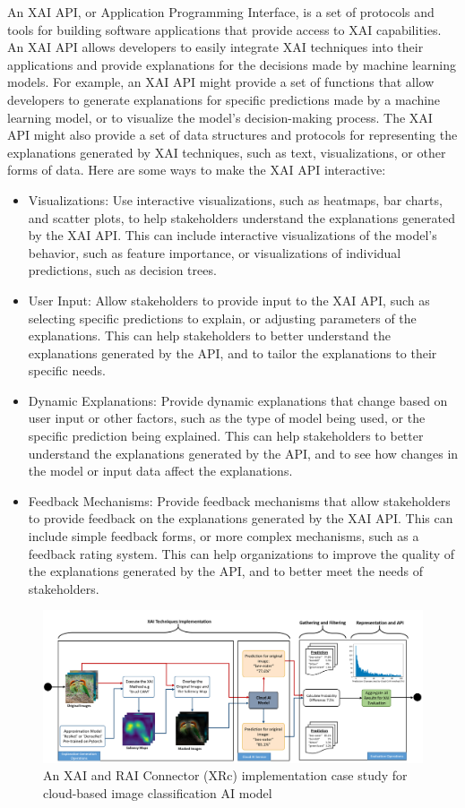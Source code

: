 \documentclass[conference]{IEEEtran}
\begin{document}
An XAI API, or Application Programming Interface, is a set of protocols and tools for building software applications that provide access to XAI capabilities. An XAI API allows developers to easily integrate XAI techniques into their applications and provide explanations for the decisions made by machine learning models. For example, an XAI API might provide a set of functions that allow developers to generate explanations for specific predictions made by a machine learning model, or to visualize the model's decision-making process. The XAI API might also provide a set of data structures and protocols for representing the explanations generated by XAI techniques, such as text, visualizations, or other forms of data. Here are some ways to make the XAI API interactive:
\begin{itemize}
	\item Visualizations: Use interactive visualizations, such as heatmaps, bar charts, and scatter plots, to help stakeholders understand the explanations generated by the XAI API. This can include interactive visualizations of the model's behavior, such as feature importance, or visualizations of individual predictions, such as decision trees.
	\item User Input: Allow stakeholders to provide input to the XAI API, such as selecting specific predictions to explain, or adjusting parameters of the explanations. This can help stakeholders to better understand the explanations generated by the API, and to tailor the explanations to their specific needs.
	\item Dynamic Explanations: Provide dynamic explanations that change based on user input or other factors, such as the type of model being used, or the specific prediction being explained. This can help stakeholders to better understand the explanations generated by the API, and to see how changes in the model or input data affect the explanations.
	\item Feedback Mechanisms: Provide feedback mechanisms that allow stakeholders to provide feedback on the explanations generated by the XAI API. This can include simple feedback forms, or more complex mechanisms, such as a feedback rating system. This can help organizations to improve the quality of the explanations generated by the API, and to better meet the needs of stakeholders.
\end{itemize}

\begin{figure}[htbp!!]
	\centering
	\includegraphics[width=1.0\textwidth]{XAI_MT.png}
	\caption{An XAI and RAI Connector (XRc) implementation case study for cloud-based image classification AI model}
	\label{MIICE}
\end{figure}
\end{document}
